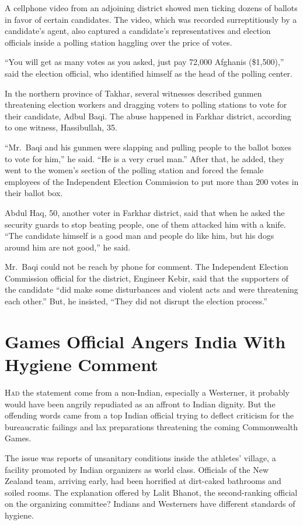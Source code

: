 ﻿\documentclass[12pt]{article}
\begin{document}
A cellphone video from an adjoining district showed men ticking dozens of ballots in favor of
certain candidates. The video, which was recorded surreptitiously by a candidate's agent, also
captured a candidate's representatives and election officials inside a polling station haggling over
the price of votes.

``You will get as many votes as you asked, just pay 72,000 Afghanis (\$1,500),'' said the election
official, who identified himself as the head of the polling center.

In the northern province of Takhar, several witnesses described gunmen threatening election workers
and dragging voters to polling stations to vote for their candidate, Adbul Baqi. The abuse happened
in Farkhar district, according to one witness, Hassibullah, 35.

``Mr.~Baqi and his gunmen were slapping and pulling people to the ballot boxes to vote for him,'' he
said. ``He is a very cruel man.'' After that, he added, they went to the women's section of the
polling station and forced the female employees of the Independent Election Commission to put more
than 200 votes in their ballot box.

Abdul Haq, 50, another voter in Farkhar district, said that when he asked the security guards to
stop beating people, one of them attacked him with a knife. ``The candidate himself is a good man
and people do like him, but his dogs around him are not good,'' he said.

Mr.~Baqi could not be reach by phone for comment. The Independent Election Commission official for
the district, Engineer Kebir, said that the supporters of the candidate ``did make some disturbances
and violent acts and were threatening each other.'' But, he insisted, ``They did not disrupt the
election process.''

\pagebreak
\section{Games Official Angers India With Hygiene Comment}

\lettrine{H}{ad} the statement come from a non-Indian, especially a
Westerner, it probably would have been angrily repudiated as an affront to Indian dignity. But the
offending words came from a top Indian official trying to deflect criticism for the bureaucratic
failings and lax preparations threatening the coming Commonwealth Games.

The issue was reports of unsanitary conditions inside the athletes' village, a facility promoted by
Indian organizers as world class. Officials of the New Zealand team, arriving early, had been
horrified at dirt-caked bathrooms and soiled rooms. The explanation offered by Lalit Bhanot, the
second-ranking official on the organizing committee? Indians and Westerners have different standards
of hygiene.
\end{document}
